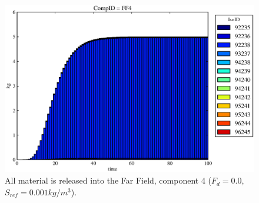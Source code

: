 \begin{figure}[ht]
\begin{minipage}[b]{0.45\linewidth}
  \includegraphics[width=\textwidth]{./mcIII0.eps}
  \caption[Case MCII Waste Package Contaminants.]{All material is released into 
    the Far Field, component 4 ($F_d=0.0$, $S_{ref} = 0.001kg/m^3$).}
  \label{fig:mcII}


  \end{minipage}
\end{figure}

